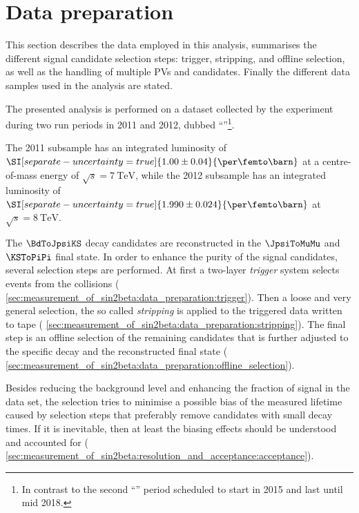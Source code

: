 
\section{Data preparation}
\label{sec:measurement_of_sin2beta:data_preparation}

This section describes the data employed in this analysis, summarises the
different signal candidate selection steps: trigger, stripping, and offline
selection, as well as the handling of multiple \acp{PV} and \Bmeson candidates.
Finally the different data samples used in the analysis are stated.

The presented analysis is performed on a dataset collected by the \LHCb
experiment during two run periods in 2011 and 2012, dubbed
\enquote{\RunOne}\footnote{In contrast to the second \enquote{\RunTwo} period
scheduled to start in 2015 and last until mid 2018.}.

The 2011 subsample has an integrated luminosity of
$\SI[separate-uncertainty=true]{1.00\pm0.04}{\per\femto\barn}$ at a
centre-of-mass energy of $\sqrt{s}=\SI{7}{\TeV}$, while the 2012 subsample has
an integrated luminosity of
$\SI[separate-uncertainty=true]{1.990\pm0.024}{\per\femto\barn}$ at
$\sqrt{s}=\SI{8}{\TeV}$.

The $\BdToJpsiKS$ decay candidates are reconstructed in the $\JpsiToMuMu$ and
$\KSToPiPi$ final state. In order to enhance the purity of the signal
candidates, several selection steps are performed. At first a two-layer
\emph{trigger} system selects events from the \protonproton collisions (\cf
\cref{sec:measurement_of_sin2beta:data_preparation:trigger}). Then a loose and very general
selection, the so called \emph{stripping} is applied to the triggered data
written to tape (\cf
\cref{sec:measurement_of_sin2beta:data_preparation:stripping}). The final step
is an offline selection of the remaining candidates that is further adjusted to
the specific decay and the reconstructed final state (\cf
\cref{sec:measurement_of_sin2beta:data_preparation:offline_selection}).

Besides reducing the background level and enhancing the fraction of signal in
the data set, the selection tries to minimise a possible bias of the measured
\Bd lifetime caused by selection steps that preferably remove candidates with
small decay times. If it is inevitable, then at least the biasing effects should
be understood and accounted for (\cf
\cref{sec:measurement_of_sin2beta:resolution_and_acceptance:acceptance}).

